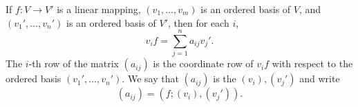 If $f: V \rightarrow V'$ is a linear mapping, $(v_1, \ldots, v_m)$ is an ordered basis of $V$, and $(v_1', \ldots, v_n')$ is an ordered basis of $V'$, then for each $i$,
$$
v_i f = \sum_{j=1}^{n} a_{ij} v_j'.
$$
The $i$-th row of the matrix $(a_{ij})$ is the coordinate row of $v_i f$ with respect to the ordered basis $(v_1', \ldots, v_n')$. We say that $(a_{ij})$ is the  $(v_i), (v_j')$ and write
$$
(a_{ij}) = (f; (v_i), (v_j')).
$$
